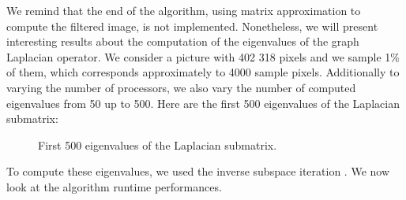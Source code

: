 We remind that the end of the algorithm, using matrix approximation to compute the filtered image, is not implemented.
Nonetheless, we will present interesting results about the computation of the eigenvalues of the graph Laplacian operator.
We consider a picture with 402 318 pixels and we sample 1\% of them, which corresponds approximately to 4000 sample pixels.
Additionally to varying the number of processors, we also vary the number of computed eigenvalues from 50 up to 500.
Here are the first 500 eigenvalues of the Laplacian submatrix:

\begin{figure}[H]
  \centering
  
  \caption{First 500 eigenvalues of the Laplacian submatrix.}
\end{figure}

To compute these eigenvalues, we used the inverse subspace iteration \cite{el_khoury_acceleration_2014}.
We now look at the algorithm runtime performances.
